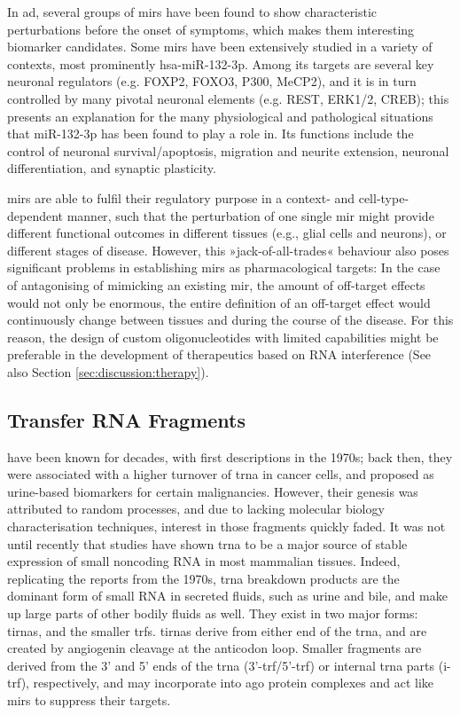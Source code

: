 In \ac{ad}, several groups of \acp{mir} have been found to show characteristic perturbations before the onset of symptoms, which makes them interesting biomarker candidates\cite{Salta2017a}. Some \acp{mir} have been extensively studied in a variety of contexts, most prominently hsa-miR-132-3p. Among its targets are several key neuronal regulators (e.g. FOXP2, FOXO3, P300, MeCP2), and it is in turn controlled by many pivotal neuronal elements (e.g. REST, ERK1/2, CREB); this presents an explanation for the many physiological and pathological situations that miR-132-3p has been found to play a role in. Its functions include the control of neuronal survival/apoptosis, migration and neurite extension, neuronal differentiation, and synaptic plasticity. 

\acp{mir} are able to fulfil their regulatory purpose in a context- and cell-type-dependent manner\cite{Lu2015}, such that the perturbation of one single \ac{mir} might provide different functional outcomes in different tissues (e.g., glial cells and neurons), or different stages of disease. However, this »jack-of-all-trades« behaviour also poses significant problems in establishing \acp{mir} as pharmacological targets: In the case of antagonising of mimicking an existing \ac{mir}, the amount of off-target effects would not only be enormous, the entire definition of an off-target effect would continuously change between tissues and during the course of the disease. For this reason, the design of custom oligonucleotides with limited capabilities might be preferable in the development of therapeutics based on RNA interference (See also Section \ref{sec:discussion:therapy}).

\subsection{Transfer RNA Fragments}
 have been known for decades, with first descriptions in the 1970s; back then, they were associated with a higher turnover of \ac{trna} in cancer cells\cite{Borek1977}, and proposed as urine-based biomarkers for certain malignancies\cite{Speer1979}. However, their genesis was attributed to random processes, and due to lacking molecular biology characterisation techniques, interest in those fragments quickly faded. It was not until recently that studies have shown \ac{trna} to be a major source of stable expression of small noncoding RNA\cite{Cole2009,Lee2009} in most mammalian tissues. Indeed, replicating the reports from the 1970s, \ac{trna} breakdown products are the dominant form of small RNA in secreted fluids, such as urine and bile, and make up large parts of other bodily fluids as well\cite{Godoy2018}. They exist in two major forms: \acp{tirna}, and the smaller \acfp{trf}. \acp{tirna} derive from either end of the \ac{trna}, and are created by angiogenin cleavage at the anticodon loop\cite{Yamasaki2009,Ivanov2011}. Smaller fragments are derived from the 3’ and 5’ ends of the \ac{trna} (3'-\ac{trf}/5'-\ac{trf}) or internal \ac{trna} parts (i-\ac{trf}), respectively, and may incorporate into \ac{ago} protein complexes and act like \acp{mir} to suppress their targets\cite{Burroughs2011,Kumar2014}.

